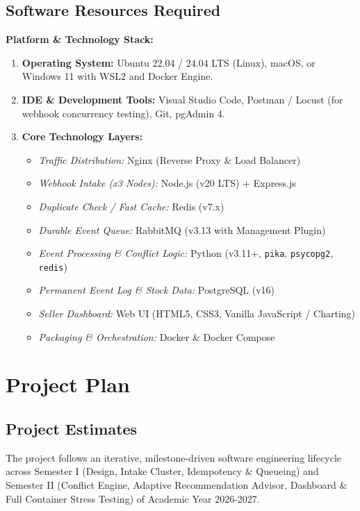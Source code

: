 \documentclass[oneside,a4paper,12pt]{report}
\newcommand{\AcademicYear}{2026-2027}
\begin{document}
\section{Software Resources Required}
\textbf{Platform \& Technology Stack:}
\begin{enumerate}
  \item \textbf{Operating System:} Ubuntu 22.04 / 24.04 LTS (Linux), macOS, or Windows 11 with WSL2 and Docker Engine.
  \item \textbf{IDE \& Development Tools:} Visual Studio Code, Postman / Locust (for webhook concurrency testing), Git, pgAdmin 4.
  \item \textbf{Core Technology Layers:}
  \begin{itemize}
    \item \textit{Traffic Distribution:} Nginx (Reverse Proxy \& Load Balancer)
    \item \textit{Webhook Intake (x3 Nodes):} Node.js (v20 LTS) + Express.js
    \item \textit{Duplicate Check / Fast Cache:} Redis (v7.x)
    \item \textit{Durable Event Queue:} RabbitMQ (v3.13 with Management Plugin)
    \item \textit{Event Processing \& Conflict Logic:} Python (v3.11+, \texttt{pika}, \texttt{psycopg2}, \texttt{redis})
    \item \textit{Permanent Event Log \& Stock Data:} PostgreSQL (v16)
    \item \textit{Seller Dashboard:} Web UI (HTML5, CSS3, Vanilla JavaScript / Charting)
    \item \textit{Packaging \& Orchestration:} Docker \& Docker Compose
  \end{itemize}
\end{enumerate}

\chapter{Project Plan}

\section{Project Estimates}
The project follows an iterative, milestone-driven software engineering lifecycle across Semester I (Design, Intake Cluster, Idempotency \& Queueing) and Semester II (Conflict Engine, Adaptive Recommendation Advisor, Dashboard \& Full Container Stress Testing) of Academic Year \AcademicYear.
\end{document}
